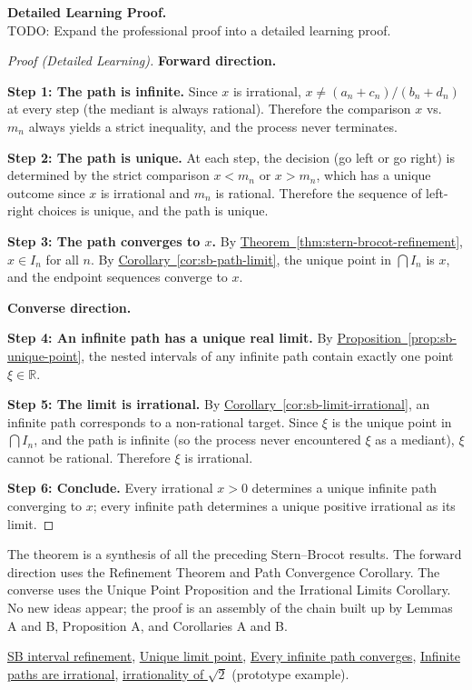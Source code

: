 \textbf{Detailed Learning Proof.}~\\
TODO: Expand the professional proof into a detailed learning proof.


\begin{proof}[Proof (Detailed Learning)]
\textbf{Forward direction.}

\textbf{Step 1: The path is infinite.}
Since $x$ is irrational, $x \neq (a_n + c_n)/(b_n + d_n)$ at every
step (the mediant is always rational).  Therefore the comparison $x$ vs.\ 
$m_n$ always yields a strict inequality, and the process never terminates.

\textbf{Step 2: The path is unique.}
At each step, the decision (go left or go right) is determined by the
strict comparison $x < m_n$ or $x > m_n$, which has a unique outcome
since $x$ is irrational and $m_n$ is rational.  Therefore the sequence
of left-right choices is unique, and the path is unique.

\textbf{Step 3: The path converges to $x$.}
By \hyperref[thm:stern-brocot-refinement]{Theorem~\ref*{thm:stern-brocot-refinement}},
$x \in I_n$ for all $n$.  By
\hyperref[cor:sb-path-limit]{Corollary~\ref*{cor:sb-path-limit}},
the unique point in $\bigcap I_n$ is $x$, and the endpoint sequences
converge to $x$.

\textbf{Converse direction.}

\textbf{Step 4: An infinite path has a unique real limit.}
By \hyperref[prop:sb-unique-point]{Proposition~\ref*{prop:sb-unique-point}},
the nested intervals of any infinite path contain exactly one point
$\xi \in \mathbb{R}$.

\textbf{Step 5: The limit is irrational.}
By \hyperref[cor:sb-limit-irrational]{Corollary~\ref*{cor:sb-limit-irrational}},
an infinite path corresponds to a non-rational target.  Since $\xi$ is
the unique point in $\bigcap I_n$, and the path is infinite (so the
process never encountered $\xi$ as a mediant), $\xi$ cannot be rational.
Therefore $\xi$ is irrational.

\textbf{Step 6: Conclude.}
Every irrational $x > 0$ determines a unique infinite path converging to
$x$; every infinite path determines a unique positive irrational as its
limit.
\end{proof}

\begin{remark*}
The theorem is a synthesis of all the preceding Stern--Brocot results.
The forward direction uses the Refinement Theorem and Path Convergence
Corollary.  The converse uses the Unique Point Proposition and the
Irrational Limits Corollary.  No new ideas appear; the proof is an
assembly of the chain built up by Lemmas A and B, Proposition A, and
Corollaries A and B.
\end{remark*}

\begin{dependencies}
\hyperref[thm:stern-brocot-refinement]{SB interval refinement},
\hyperref[prop:sb-unique-point]{Unique limit point},
\hyperref[cor:sb-path-limit]{Every infinite path converges},
\hyperref[cor:sb-limit-irrational]{Infinite paths are irrational},
\hyperref[thm:sqrt2-irrational]{irrationality of $\sqrt{2}$} (prototype example).
\end{dependencies}

